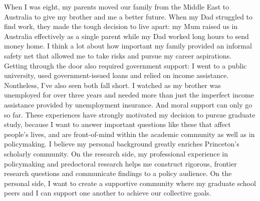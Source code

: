 \documentclass[11pt]{article}
\begin{document}


When I was eight, my parents moved our family from the Middle East to Australia to give my brother and me a better future. When my Dad struggled to find work, they made the tough decision to live apart: my Mum raised us in Australia effectively as a single parent while my Dad worked long hours to send money home.
\psbreak
I think a lot about how important my family provided an informal safety net that allowed me to take risks and pursue my career aspirations. Getting through the door also required government support: I went to a public university, used government-issued loans and relied on income assistance. Nontheless, I've also seen both fall short. I watched as my brother was unemployed for over three years and needed more than just the imperfect income assistance provided by unemployment insurance. And moral support can only go so far.
\psbreak
These experiences have strongly motivated my decision to pursue graduate study, because I want to answer important questions like these that affect people's lives, and are front-of-mind within the academic community as well as in policymaking.
\psbreak
I believe my personal background greatly enriches Princeton's scholarly community. On the research side, my professional experience in policymaking and predoctoral research helps me construct rigorous, frontier research questions and communicate findings to a policy audience. On the personal side, I want to create a supportive community
where my graduate school peers and I can support one another to achieve our collective goals.


\end{document}
